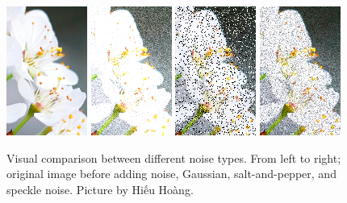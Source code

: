 \begin{figure}[H]
    \vspace{4mm}
    \centering
    \includegraphics[width=.24\textwidth]{img/flower/flower.png}
    \includegraphics[width=.24\textwidth]{img/flower/noise-gauss.png}
    \includegraphics[width=.24\textwidth]{img/flower/noise-sp.png}
    \includegraphics[width=.24\textwidth]{img/flower/noise-speckle.png}
    \vspace{-2mm}
    \caption{Visual comparison between different noise types.
    From left to right; original image before adding noise, Gaussian, salt-and-pepper, and speckle noise.
    Picture by Hi\'{\^{e}}u Hoàng.
    }
    \label{fig:noise-comp}
    \vspace{4mm}
\end{figure}